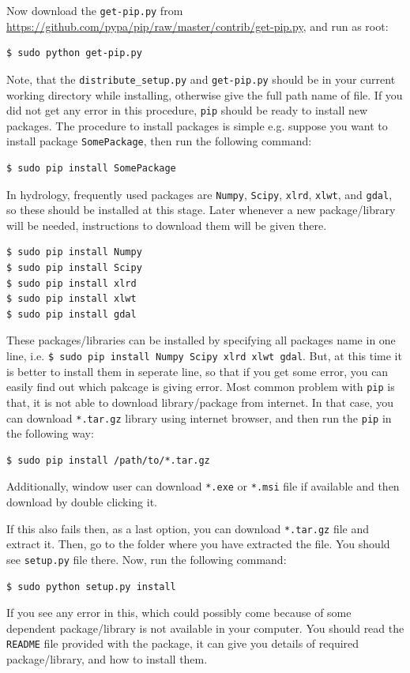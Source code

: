 \documentclass[10pt]{book}
\begin{document}

Now download the \verb"get-pip.py" from \url{https://github.com/pypa/pip/raw/master/contrib/get-pip.py}, and run as root:
\beforeverb
\begin{verbatim}
$ sudo python get-pip.py
\end{verbatim}
\afterverb

Note, that the \verb"distribute_setup.py" and \verb"get-pip.py" should be in your current working directory while installing, otherwise give the full path name of file. If you did not get any error in this procedure, \verb"pip" should be ready to install new packages. The procedure to install packages is simple e.g. suppose you want to install package \verb"SomePackage", then run the following command:
\beforeverb
\begin{verbatim}
$ sudo pip install SomePackage
\end{verbatim}
\afterverb

In hydrology, frequently used packages are \verb"Numpy", \verb"Scipy", \verb"xlrd", \verb"xlwt", and \verb"gdal", so these should be installed at this stage. Later whenever a new package/library will be needed, instructions to download them will be given there. 
\beforeverb
\begin{verbatim}
$ sudo pip install Numpy
$ sudo pip install Scipy
$ sudo pip install xlrd
$ sudo pip install xlwt
$ sudo pip install gdal
\end{verbatim}
\afterverb
These packages/libraries can be installed by specifying all packages name in one line, i.e. \verb"$ sudo pip install Numpy Scipy xlrd xlwt gdal". But, at this time it is better to install them in seperate line, so that if you get some error, you can easily find out which pakcage is giving error. 
Most common problem with \verb"pip" is that, it is not able to download library/package from internet. In that case, you can download \verb"*.tar.gz" library using internet browser, and then run the \verb"pip" in the following way:
\beforeverb
\begin{verbatim}
$ sudo pip install /path/to/*.tar.gz
\end{verbatim}
\afterverb
Additionally, window user can download \verb"*.exe" or \verb"*.msi" file if available and then download by double clicking it.

If this also fails then, as a last option, you can download \verb"*.tar.gz" file and extract it. Then, go to the folder where you have extracted the file. You should see \verb"setup.py" file there. Now, run the following command:
\beforeverb
\begin{verbatim}
$ sudo python setup.py install 
\end{verbatim}
\afterverb
If you see any error in this, which could possibly come because of some dependent package/library is not available in your computer. You should read the \verb"README" file provided with the package, it can give you details of required package/library, and how to install them. \\
\end{document}
